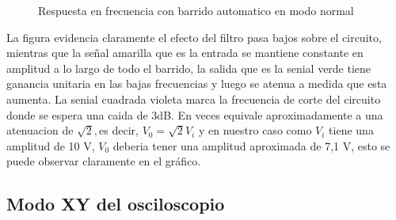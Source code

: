 \begin{figure}[H]
\begin{center}
\par\end{center}
\caption{Respuesta en frecuencia con barrido automatico en modo normal}
\end{figure}

La figura evidencia claramente el efecto del filtro pasa bajos sobre
el circuito, mientras que la señal amarilla que es la entrada se
mantiene constante en amplitud a lo largo de todo el barrido, la salida
que es la senial verde tiene ganancia unitaria en las bajas frecuencias
y luego se atenua a medida que esta aumenta. La senial cuadrada violeta
marca la frecuencia de corte del circuito donde se espera una caida
de 3dB. En veces equivale aproximadamente a una atenuacion de $\sqrt{2},$es
decir, $V_{0}=\sqrt{2}V_{i}$ y en nuestro caso como $V_{i}$ tiene
una amplitud de 10 V, $V_{0}$ deberia tener una amplitud aproximada
de 7,1 V, esto se puede observar claramente en el gráfico.

\subsection{Modo XY del osciloscopio}

